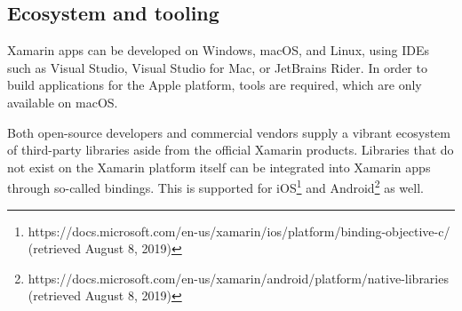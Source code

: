\subsection{Ecosystem and tooling}

Xamarin apps can be developed on Windows, macOS, and Linux, using IDEs such as Visual Studio, Visual Studio for Mac, or JetBrains Rider. In order to build applications for the Apple platform, tools are required, which are only available on macOS.

Both open-source developers and commercial vendors supply a vibrant ecosystem of third-party libraries aside from the official Xamarin products. Libraries that do not exist on the Xamarin platform itself can be integrated into Xamarin apps through so-called bindings. This is supported for iOS\footnote{https://docs.microsoft.com/en-us/xamarin/ios/platform/binding-objective-c/ (retrieved August 8, 2019)} and Android\footnote{https://docs.microsoft.com/en-us/xamarin/android/platform/native-libraries (retrieved August 8, 2019)} as well.
